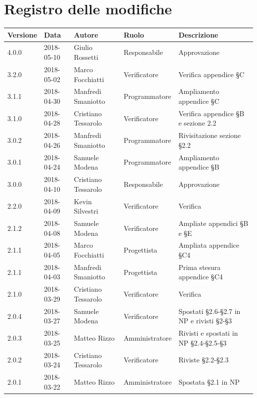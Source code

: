 \documentclass[openany,12pt,a4paper]{report}
\begin{document}
\chapter*{Registro delle modifiche}
\setlength\LTleft{-22mm}
\begin{longtable}{|p{20mm}|p{20mm}|p{40mm}|p{30mm}|p{50mm}|}
	\hline
	\textbf{Versione} & \textbf{Data} & \textbf{Autore} & \textbf{Ruolo} & \textbf{Descrizione} \\
		
		\hline 4.0.0 & 2018-05-10 & Giulio Rossetti & Responsabile & Approvazione \\ 
		\hline 3.2.0 & 2018-05-02 & Marco Focchiatti & Verificatore & Verifica appendice §C \\ 
		\hline 3.1.1 & 2018-04-30 & Manfredi Smaniotto & Programmatore & Ampliamento appendice §C \\
		\hline 3.1.0 & 2018-04-28 & Cristiano Tessarolo & Verificatore & Verifica appendice §B e sezione 2.2 \\
		\hline 3.0.2 & 2018-04-26 & Manfredi Smaniotto & Programmatore & Rivisitazione sezione §2.2 \\
		\hline 3.0.1 & 2018-04-24 & Samuele Modena & Programmatore & Ampliamento appendice §B \\
		\hline 3.0.0 & 2018-04-10 & Cristiano Tessarolo & Responsabile & Approvazione \\
		\hline 2.2.0 & 2018-04-09 & Kevin Silvestri & Verificatore & Verifica \\
		\hline 2.1.2 & 2018-04-08 & Samuele Modena & Verificatore & Ampliate appendici §B e §E \\
		\hline 2.1.1 & 2018-04-05 & Marco Focchiatti & Progettista & Ampliata appendice §C4 \\
		\hline 2.1.1 & 2018-04-03 & Manfredi Smaniotto & Progettista & Prima stesura appendice §C4  \\
		\hline 2.1.0 & 2018-03-29 & Cristiano Tessarolo & Verificatore & Verifica \\
		\hline 2.0.4 & 2018-03-27 & Samuele Modena & Verificatore & Spostati §2.6-§2.7 in NP e rivisti §2-§3 \\
		\hline 2.0.3 & 2018-03-25 & Matteo Rizzo & Amministratore & Rivisti e spostati in NP §2.4-§2.5-§3  \\
		\hline 2.0.2 & 2018-03-24 & Cristiano Tessarolo & Verificatore & Riviste §2.2-§2.3 \\
		\hline 2.0.1 & 2018-03-22 & Matteo Rizzo & Amministratore & Spostata §2.1 in NP \\
		

\end{longtable}
\end{document}
